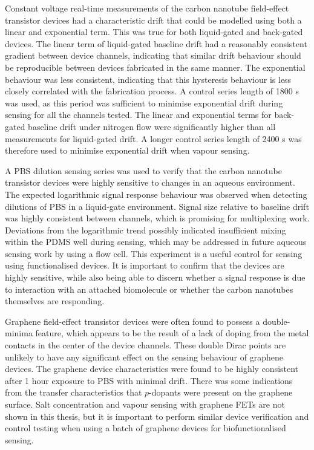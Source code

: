 \documentclass[
  letterpaper,
  DIV=11,
  numbers=noendperiod]{scrartcl}
\begin{document}
Constant voltage real-time measurements of the carbon nanotube
field-effect transistor devices had a characteristic drift that could be
modelled using both a linear and exponential term. This was true for
both liquid-gated and back-gated devices. The linear term of
liquid-gated baseline drift had a reasonably consistent gradient between
device channels, indicating that similar drift behaviour should be
reproducible between devices fabricated in the same manner. The
exponential behaviour was less consistent, indicating that this
hysteresis behaviour is less closely correlated with the fabrication
process. A control series length of 1800 s was used, as this period was
sufficient to minimise exponential drift during sensing for all the
channels tested. The linear and exponential terms for back-gated
baseline drift under nitrogen flow were significantly higher than all
measurements for liquid-gated drift. A longer control series length of
2400 s was therefore used to minimise exponential drift when vapour
sensing.

A PBS dilution sensing series was used to verify that the carbon
nanotube transistor devices were highly sensitive to changes in an
aqueous environment. The expected logarithmic signal response behaviour
was observed when detecting dilutions of PBS in a liquid-gate
environment. Signal size relative to baseline drift was highly
consistent between channels, which is promising for multiplexing work.
Deviations from the logarithmic trend possibly indicated insufficient
mixing within the PDMS well during sensing, which may be addressed in
future aqueous sensing work by using a flow cell. This experiment is a
useful control for sensing using functionalised devices. It is important
to confirm that the devices are highly sensitive, while also being able
to discern whether a signal response is due to interaction with an
attached biomolecule or whether the carbon nanotubes themselves are
responding.

Graphene field-effect transistor devices were often found to possess a
double-minima feature, which appears to be the result of a lack of
doping from the metal contacts in the center of the device channels.
These double Dirac points are unlikely to have any significant effect on
the sensing behaviour of graphene devices. The graphene device
characteristics were found to be highly consistent after 1 hour exposure
to PBS with minimal drift. There was some indications from the transfer
characteristics that \(p\)-dopants were present on the graphene surface.
Salt concentration and vapour sensing with graphene FETs are not shown
in this thesis, but it is important to perform similar device
verification and control testing when using a batch of graphene devices
for biofunctionalised sensing.
\end{document}
